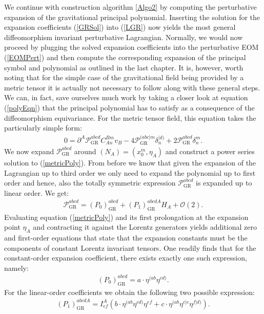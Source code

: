 We continue with construction algorithm \ref{Algo2} by computing the perturbative expansion of the gravitational principal polynomial. Inserting the solution for the expansion coefficients (\ref{GRSol}) into (\ref{LGR}) now yields the most general diffeomorphism invariant perturbative Lagrangian. Normally, we would now proceed by plugging the solved expansion coefficients into the perturbative EOM (\ref{EOMPert}) and then compute the corresponding expansion of the principal symbol and polynomial as outlined in the last chapter. It is, however, worth noting that for the simple case of the gravitational field being provided by a metric tensor it is actually not necessary to follow along with these general steps. We can, in fact, save ourselves much work by taking a closer look at equation (\ref{polyEqn}) that the principal polynomial has to satisfy as a consequence of the diffeomorphism equivariance. For the metric tensor field, this equation takes the particularly simple form:
\begin{align}\label{metricPoly}
    0 = \partial^A \mathcal{P}_{\text{GR}}^{abcd} C_{An}^{Bm} v_B - 4\mathcal{P}_{\text{GR}}^{(abc\vert m} \delta_n^{\vert d)} + 2 \mathcal{P}_{\text{GR}}^{abcd} \delta^m_n.
\end{align}
We now expand $\mathcal{P}_{\text{GR}}^{abcd}$ around $(N_{A}) = (x_0^m, \eta_A)$ and construct a power series solution to (\ref{metricPoly}). From before we know that given the expansion of the Lagrangian up to third order we only need to expand the polynomial up to first order and hence, also the totally symmetric expression $\mathcal{P}_{\text{GR}}^{abcd}$ is expanded up to linear order. We get:
\begin{align}
    \mathcal{P}_{\text{GR}}^{abcd} = (P_0)_{\text{GR}}^{abcd} + (P_1)_{\text{GR}}^{abcdA} H_A + \mathcal{O}(2).
\end{align}
Evaluating equation (\ref{metricPoly}) and its first prolongation at the expansion point $\eta_A$ and contracting it against the Lorentz generators yields additional zero and first-order equations that state that the expansion constants must be the components of constant Lorentz invariant tensors. One readily finds that for the constant-order expansion coefficient, there exists exactly one such expression, namely:
\begin{align}
   (P_0)_{\text{GR}}^{abcd} = a \cdot \eta^{(ab} \eta^{cd)}. 
\end{align}
For the linear-order coefficients we obtain the following two possible expression:
\begin{align}
    (P_1)_{\text{GR}}^{abcdA} = I^A_{ef} \left (b \cdot \eta^{(ab} \eta^{cd)}  \eta^{ef} + c \cdot \eta^{(ab} \eta^{c \vert e} \eta^{f \vert d)} \right ).
\end{align}
